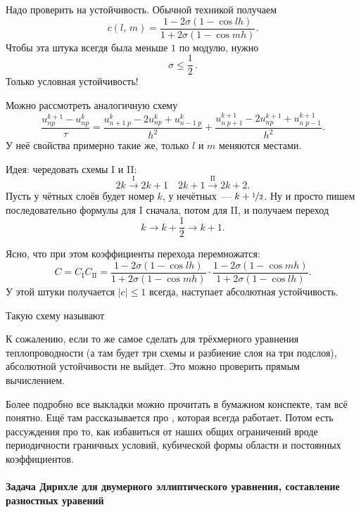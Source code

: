 \documentclass{trlnotes}
\begin{document}
Надо проверить на устойчивость. Обычной техникой получаем
\[
	c(l, \, m) = \dfrac{1 - 2\sigma(1 - \cos lh)}{1 + 2\sigma(1 - \cos mh)}.
\]
Чтобы эта штука всегдя была меньше $1$ по модулю, нужно
\[
	\boxed{\sigma \leqslant \dfrac{1}{2}}\,.
\]
Только условная устойчивость!

Можно рассмотреть аналогичную схему
\[
	\dfrac{u^{k+1}_{np} - u^{k}_{np}}{\tau} = \dfrac{u^{k}_{n+1 \; p} - 2u^{k}_{np} + u^{k}_{n-1 \; p}}{h^2} + \dfrac{u^{k+1}_{n \; p+1} - 2u^{k+1}_{np} + u^{k+1}_{n \; p - 1}}{h^2}.
\]
У неё свойства примерно такие же, только $l$ и $m$ меняются местами.

Идея: чередовать схемы I и II:
\[
	2k \xrightarrow{\text{I}} 2k+1 \quad 2k+1 \xrightarrow{\text{II}} 2k+2.
\]
Пусть у чётных слоёв будет номер $k$, у нечётных~--- $k + \nicefrac{1}{2}$. Ну и просто пишем последовательно формулы для I сначала, потом для II, и получаем переход
\[
	k \to k+ \frac{1}{2} \to k+1.
\]

Ясно, что при этом коэффициенты перехода перемножатся:
\[
	C = C_{\text{I}} C_{\text{II}} = \dfrac{1 - 2\sigma(1 - \cos lh)}{1 + 2\sigma(1 - \cos mh)} \cdot \dfrac{1 - 2\sigma(1 - \cos mh)}{1 + 2\sigma(1 - \cos lh)}.
\]
У этой штуки получается $|c| \leqslant 1$ всегда, наступает абсолютная устойчивость.

Такую схему называют 

\begin{rem}
	К сожалению, если то же самое сделать для трёхмерного уравнения теплопроводности (а там будет три схемы и разбиение слоя на три подслоя), абсолютной устойчивости не выйдет. Это можно проверить прямым вычислением.
\end{rem}

\begin{rem}
	Более подробно все выкладки можно прочитать в бумажном конспекте, там всё понятно. Ещё там рассказывается про , которая всегда работает. Потом есть рассуждения про то, как избавиться от наших общих ограничений вроде периодичности граничных условий, кубической формы области и постоянных коэффициентов.
\end{rem}



\paragraph{Задача Дирихле для двумерного эллиптического уравнения, составление разностных уравений}
\label{par:pde::elldirprobl}
\end{document}
